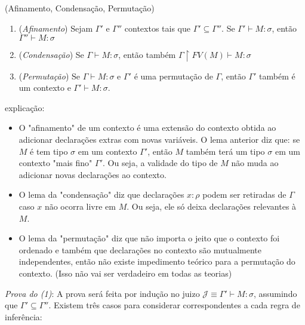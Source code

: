 \documentclass[../main.tex]{subfiles}
\begin{document}
\begin{lemma}(Afinamento, Condensação, Permutação)
    \begin{enumerate}
        \item (\emph{Afinamento}) Sejam $\Gamma'$ e $\Gamma''$ contextos tais que $\Gamma' \subseteq \Gamma''$. Se $\Gamma' \vdash M : \sigma$, então $\Gamma'' \vdash M : \sigma$
        \item (\emph{Condensação}) Se $\Gamma \vdash M : \sigma$, então também  $\Gamma \upharpoonright FV(M) \vdash M : \sigma$
        \item (\emph{Permutação}) Se $\Gamma \vdash M : \sigma$ e $\Gamma'$ é uma permutação de $\Gamma$, então $\Gamma'$ também é um contexto e $\Gamma' \vdash M : \sigma$.
    \end{enumerate}
\end{lemma}

explicação:

\begin{itemize}
    \item O "afinamento" de um contexto é uma extensão do contexto obtida ao adicionar declarações extras com novas variáveis. O lema anterior diz que: se $M$ é tem tipo $\sigma$ em um contexto $\Gamma'$, então $M$ também terá um tipo $\sigma$ em um contexto "mais fino" $\Gamma'$. Ou seja, a validade do tipo de $M$ não muda ao adicionar novas declarações ao contexto. 
    \item O lema da "condensação" diz que declarações $x : \rho$ podem ser retiradas de $\Gamma$ caso $x$ não ocorra livre em $M$. Ou seja, ele só deixa declarações relevantes à $M$.
    \item O lema da "permutação" diz que não importa o jeito que o contexto foi ordenado e também que declarações no contexto são mutualmente independentes, então não existe impedimento teórico para a permutação do contexto. (Isso não vai ser verdadeiro em todas as teorias)
\end{itemize}

\emph{Prova do (1)}: A prova será feita por indução no juizo $\mathcal{J} \equiv \Gamma' \vdash M : \sigma$, assumindo que $\Gamma' \subseteq \Gamma''$. Existem três casos para considerar correspondentes a cada regra de inferência:
\end{document}
